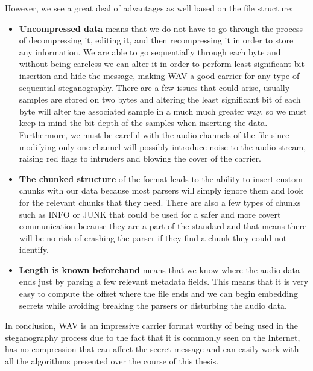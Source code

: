 \begin{multicols*}{2}
However, we see a great deal of advantages as well based on the file structure:
\begin{itemize}
	\item \textbf{Uncompressed data} means that we do not have to go through the process of decompressing it, editing it, and then recompressing it in order to store any information. We are able to go sequentially through each byte and without being careless we can alter it in order  to perform least significant bit insertion and hide the message, making WAV a good carrier for any type of sequential steganography. There are a few issues that could arise, usually samples are stored on two bytes and altering the least significant bit of each byte will alter the associated sample in a much much greater way, so we must keep in mind the bit depth of the samples when inserting the data. Furthermore, we must be careful with the audio channels of the file since modifying only one channel will possibly introduce noise to the audio stream, raising red flags to intruders and blowing the cover of the carrier.
	\item \textbf{The chunked structure} of the format leads to the ability to insert custom chunks with our data because most parsers will simply ignore them and look for the relevant chunks that they need. There are also a few types of chunks such as INFO or JUNK that could be used for a safer and more covert communication because they are a part of the standard and that means there will be no risk of crashing the parser if they find a chunk they could not identify.
	\item \textbf{Length is known beforehand} means that we know where the audio data ends just by parsing a few relevant metadata fields. This means that it is very easy to compute the offset where the file ends and we can begin embedding secrets while avoiding breaking the parsers or disturbing the audio data.
\end{itemize}

In conclusion, WAV is an impressive carrier format worthy of being used in the steganography process due to the fact that it is commonly seen on the Internet, has no compression that can affect the secret message and can easily work with all the algorithms presented over the course of this thesis.


\end{multicols*}
